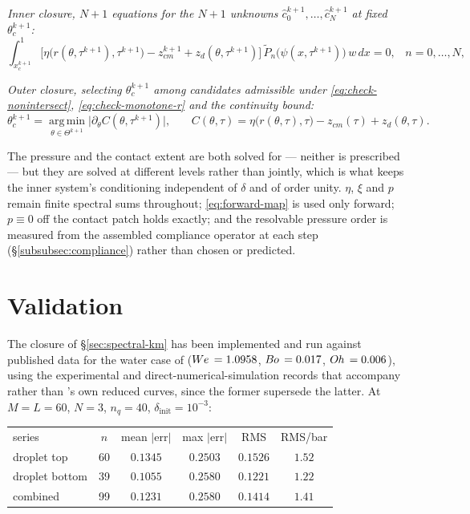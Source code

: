 \emph{Inner closure, $N+1$ equations for the $N+1$ unknowns $\hat c_0^{k+1},\dots,\hat c_N^{k+1}$ at fixed $\theta_c^{k+1}$:}
\begin{equation}
    \int_{x_c^{k+1}}^1\Big[\eta\big(r(\theta,\tau^{k+1}),\tau^{k+1}\big)-z_{cm}^{k+1}+z_d(\theta,\tau^{k+1})\Big]\,\tilde P_n\big(\psi(x,\tau^{k+1})\big)\,w\,dx=0\text{,}\quad n=0,\dots,N\text{,}
    \label{eq:summary-galerkin}
\end{equation}

\emph{Outer closure, selecting $\theta_c^{k+1}$ among candidates admissible under \eqref{eq:check-nonintersect}, \eqref{eq:check-monotone-r} and the continuity bound:}
\begin{equation}
    \theta_c^{k+1}=\operatorname*{arg\,min}_{\theta\in\Theta^{k+1}}\big|\partial_\theta C(\theta,\tau^{k+1})\big|\text{,}\qquad
    C(\theta,\tau) = \eta\big(r(\theta,\tau),\tau\big)-z_{cm}(\tau)+z_d(\theta,\tau)\text{.}
    \label{eq:summary-theta-c}
\end{equation}

The pressure and the contact extent are both solved for --- neither is prescribed --- but they are solved at different levels rather than jointly, which is what keeps the inner system's conditioning independent of $\delta$ and of order unity. $\eta$, $\xi$ and $p$ remain finite spectral sums throughout; \eqref{eq:forward-map} is used only forward; $p\equiv0$ off the contact patch holds exactly; and the resolvable pressure order is measured from the assembled compliance operator at each step (\S\ref{subsubsec:compliance}) rather than chosen or predicted.

\section{Validation}
\label{sec:validation}

\hspace*{1em}The closure of \S\ref{sec:spectral-km} has been implemented and run against
published data for the water case of \cite{AlventosaEtAl2023} ($W\kern-0.03em e\,=1.0958$, $B\kern-0.04em o\,=0.017$,
$O\kern-0.04em h\,=0.006$), using the experimental and direct-numerical-simulation records that
accompany \cite{AgueroEtAl2026} rather than \cite{AlventosaEtAl2023}'s own reduced
curves, since the former supersede the latter. At $M=L=60$, $N=3$, $n_q=40$,
$\delta_{\text{init}}=10^{-3}$:

\begin{center}
\begin{tabular}{lccccc}
series & $n$ & mean $|$err$|$ & max $|$err$|$ & RMS & RMS/bar \\
droplet top & 60 & $0.1345$ & $0.2503$ & $0.1526$ & $1.52$ \\
droplet bottom & 39 & $0.1055$ & $0.2580$ & $0.1221$ & $1.22$ \\
combined & 99 & $0.1231$ & $0.2580$ & $0.1414$ & $1.41$ \\
\end{tabular}
\end{center}

